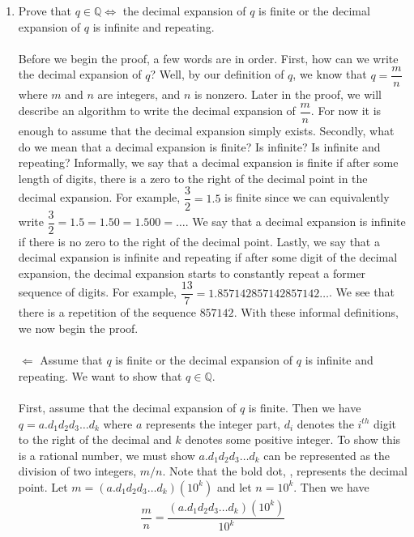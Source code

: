 \documentclass[12pt]{article}
\begin{document}
\problem 
\begin{enumerate}
\item Prove that $q \in \mathbb{Q} \Leftrightarrow $ the decimal expansion of $q$ is finite or the decimal expansion of $q$ is infinite and repeating. \\ \\
Before we begin the proof, a few words are in order. First, how can we write the decimal expansion of $q$? Well, by our definition of $q$, we know that $q=\dfrac{m}{n}$ where $m$ and $n$ are integers, and $n$ is nonzero. Later in the proof, we will describe an algorithm to write the decimal expansion of $\dfrac{m}{n}$.  For now it is enough to assume that the decimal expansion simply exists. Secondly, what do we mean that a decimal expansion is finite? Is infinite? Is infinite and repeating? Informally, we say that a decimal expansion is finite if after some length of digits, there is a zero to the right of the decimal point in the decimal expansion. For example, $\dfrac{3}{2}=1.5$ is finite since we can equivalently write $\dfrac{3}{2}=1.5=1.50=1.500=\ldots$. We say that a decimal expansion is infinite if there is no zero to the right of the decimal point. Lastly, we say that a decimal expansion is infinite and repeating if after some digit of the decimal expansion, the decimal expansion starts to constantly repeat a former sequence of digits. For example, $\dfrac{13}{7}=1.857142857142857142\ldots$. We see that there is a repetition of the sequence $857142$. With these informal definitions, we now begin the proof. \\ \\
$\Leftarrow$ Assume that $q$ is finite or the decimal expansion of $q$ is infinite and repeating. We want to show that $q \in \mathbb{Q}$. \\ \\ First, assume that the decimal expansion of $q$ is finite. Then we have $q= a \textbf{.} d_{1} d_{2} d_{3} \ldots d_{k}$ where $a$ represents the integer part, $d_{i}$ denotes the $i^{th}$ digit to the right of the decimal and $k$ denotes some positive integer. To show this is a rational number, we must show $a \textbf{.} d_{1} d_{2} d_{3} \ldots d_{k}$ can be represented as the division of two integers, $m/n$. Note that the bold dot, , represents the decimal point. Let $m= (a \textbf{.} d_{1} d_{2} d_{3} \ldots d_{k})(10^{k})$ and let $n= 10^{k}$. Then we have
\begin{align*}
\dfrac{m}{n} = \dfrac{(a \textbf{.} d_{1} d_{2} d_{3} \ldots d_{k})(10^{k})}{10^{k}} \\

\end{align*}
\end{enumerate}
\end{document}
